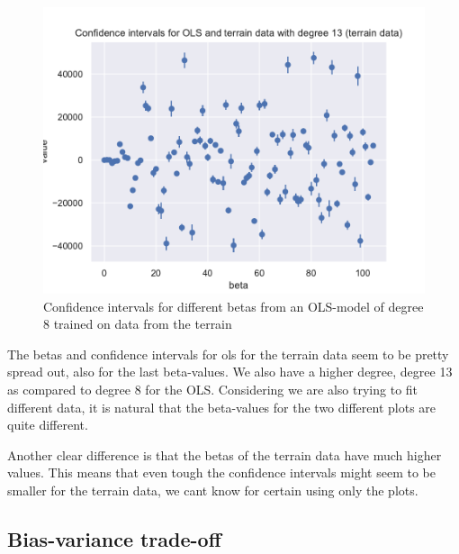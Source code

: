 \documentclass[12pt]{article}
\begin{document}
\begin{figure}[H]
    \centering
    \includegraphics[width=0.8\columnwidth]{../src/output/ols_confidence_intervals_terrain_data.pdf}
    \caption{Confidence intervals for different betas from an OLS-model of degree 8 trained on data from the terrain}
    \label{fig:ols_confidence_intervals_terrain}
\end{figure}

The betas and confidence intervals for ols for the terrain data seem to be pretty spread out, also for the last beta-values.
We also have a higher degree, degree 13 as compared to degree 8 for the OLS.
Considering we are also trying to fit different data, it is natural that the beta-values for the two different plots are quite different.

Another clear difference is that the betas of the terrain data have much higher values.
This means that even tough the confidence intervals might seem to be smaller for the terrain data, we cant know for certain using only the plots.


\subsection{Bias-variance trade-off}
\end{document}
